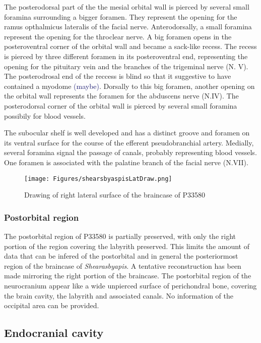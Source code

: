 \documentclass[12pt,letterpaper]{article}
\begin{document}
The posterodorsal part of the the mesial orbital wall is pierced by several small foramina surrounding a bigger foramen. They represent the opening for the ramus opthalmicus lateralis of the facial nerve. Anterodorsally, a small foramina represent the opening for the throclear nerve. A big foramen opens in the posteroventral corner of the orbital wall and became a sack-like recess. The recess is pierced by three different foramen in its posteroventral end, representing the opening for the pituitary vein and the branches of the trigeminal nerve (N. V). The posterodrosal end of the reccess is blind so that it suggestive to have contained a myodome \textcolor{MidnightBlue}{(maybe)}. Dorsally to this big foramen, another opening on the orbital wall represents the foramen for the abduscens nerve (N.IV). The posterodorsal corner of the orbital wall is pierced by several small foramina possibily for blood vessels.

The subocular shelf is well developed and has a distinct groove and foramen on its ventral surface for the course of the efferent pseudobranchial artery. Medially, several foramina signal the passage of canals, probably representing blood vessels. One foramen is associated with the palatine branch of the facial nerve (N.VII).

\begin{figure}[!h]
\centerline{\texttt{[image: Figures/shearsbyaspisLatDraw.png]}}
\caption{\footnotesize{Drawing of right lateral surface of the braincase of P33580}}
\label{lateral}
\end{figure}

\subsubsection{Postorbital region}

The postorbital region of P33580 is partially preserved, with only the right portion of the region covering the labyrith preserved. This limits the amount of data that can be infered of the postorbital and in general the posteriormost region of the braincase of \textit{Shearasbyapis}. A tentative reconstruction has been made mirroring the right portion of the braincase. The postorbital region of the neurocranium appear like a wide unpierced surface of perichondral bone, covering the brain cavity, the labyrith and associated canals. No information of the occipital area can be provided.

\subsection{Endocranial cavity}
\end{document}
